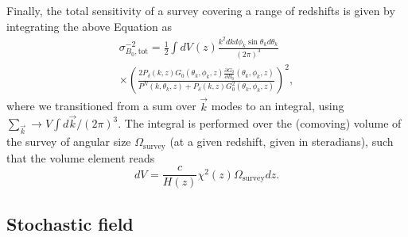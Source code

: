 \documentclass[aps,prd,twocolumn,floatfix,showpacs,superscriptaddress,nofootinbib]{revtex4-1}
\newcommand{\beq}{\begin{equation}}
\newcommand{\eeq}{\end{equation}}
\newcommand{\bga}{\begin{gathered}}
\newcommand{\ega}{\end{gathered}}
\begin{document}
Finally, the total sensitivity of a survey covering a range of redshifts is given by integrating the above Equation as
\beq
\bga
\sigma_{ B_0,\text{tot}}^{-2} = 
\frac{1}{2}\int dV_\mathrm{}(z)
\frac{k^2dk d\phi_k\sin \theta_kd\theta_k}{(2\pi)^3}\\
\times\left( \frac{2P_\delta(k,z)G_0(\theta_k,\phi_k,z)\frac{\partial G_0}{\partial B_0}(\theta_k, \phi_k,z)}{P^N(k,\theta_k,z) + P_\delta(k,z)G_0^2(\theta_k,\phi_k,z)} \right)^2,
\ega
\label{eq:fisher_patch}
\eeq
where we transitioned from a sum over $\vec k$ modes to an integral, using $\sum_{\vec k} \to V\int d\vec k /(2\pi)^3$. 
The integral is performed over the (comoving) volume of the survey of angular size $\Omega_\mathrm{survey}$ (at a given redshift, given in steradians), such that the volume element reads
\beq
dV_\mathrm{} = \frac{c}{H(z)}\chi^2(z)\Omega_\mathrm{survey}dz.
\label{eq:dVpatch}
\eeq

\subsection{Stochastic field}
\label{subsec:SI}
\end{document}
